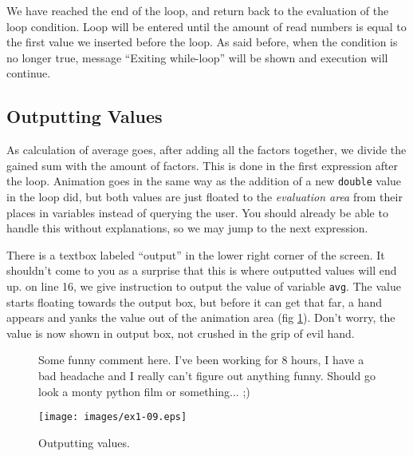 \documentclass[a4paper,12pt,english]{article}
\newcommand{\p}[1]{\texttt{#1}}
\begin{document}
We have reached the end of the loop, and return back to the evaluation of the loop condition. Loop will be entered until the amount of read numbers is equal to the first value we inserted before the loop. As said before, when the condition is no longer true, message ``Exiting while-loop'' will be shown and execution will continue.

\subsection{Outputting Values}

As calculation of average goes, after adding all the factors together, we divide the gained sum with the amount of factors. This is done in the first expression after the loop. Animation goes in the same way as the addition of a new \p{double} value in the loop did, but both values are just floated to the \emph{evaluation area} from their places in variables instead of querying the user. You should already be able to handle this without explanations, so we may jump to the next expression.

There is a textbox labeled ``output'' in the lower right corner of the screen. It shouldn't come to you as a surprise that this is where outputted values will end up. on line 16, we give instruction to output the value of variable \p{avg}. The value starts floating towards the output box, but before it can get that far, a hand appears and yanks the value out of the animation area (fig \ref{fig:ex1-09}). Don't worry, the value is now shown in output box, not crushed in the grip of evil hand.

\begin{figure}[ht]
  \begin{minipage}[t]{.49\textwidth}
    \begin{center}  
	Some funny comment here. I've been working for 8 hours, I have a bad headache and I really can't figure out anything funny. Should go look a monty python film or something... ;)
    \end{center}
  \end{minipage}
  \hfill
  \begin{minipage}[t]{.49\textwidth}
    \begin{center}  
      \texttt{[image: images/ex1-09.eps]}
      \caption{\label{fig:ex1-09}Outputting values.}
    \end{center}
  \end{minipage}
\end{figure}
\end{document}
